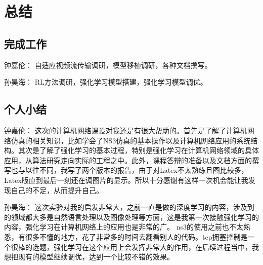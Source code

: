 \section{总结}

\subsection{完成工作}

钟嘉伦：
自适应视频流传输调研，模型移植调研，各种文档撰写。

孙昊海：
RL方法调研，强化学习模型搭建，强化学习模型调优。

\subsection{个人小结}

钟嘉伦：
这次的计算机网络课设对我还是有很大帮助的。首先是了解了计算机网络仿真的相关知识，比如学会了NS3仿真的基本操作以及计算机网络应用的系统结构。其次是了解了强化学习的基本过程，特别是强化学习在计算机网络领域的具体应用，从算法研究走向实际的工程之中。此外，课程答辩的准备以及文档方面的撰写也与以往不同，我写了两个版本的报告，由于对Latex不太熟练且图比较多，Latex版直到最后一刻还在调图片的显示。所以十分感谢有这样一次机会能让我发现自己的不足，从而提升自己。

孙昊海：
这次实验对我的启发非常大，之前一直是做的深度学习的内容，涉及到的领域都大多是自然语言处理以及图像处理等方面，这是我第一次接触强化学习的内容，强化学习在计算机网络上的应用也是非常的广。
ns3的使用之前也不太熟悉，有很多不懂的地方，花了非常多的时间去翻看别人的代码。tcp拥塞控制是一个很棒的选题，强化学习在这个应用上会发挥非常大的作用，在后续过程当中，我想把现有的模型继续调优，达到一个比较不错的效果。